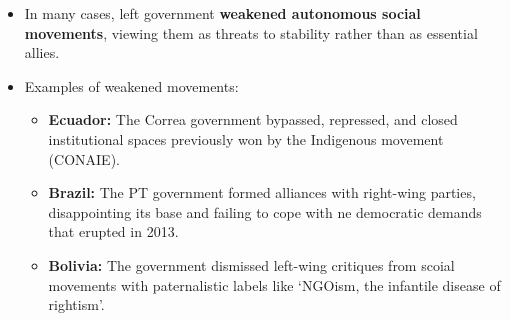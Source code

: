 \documentclass{article}
\begin{document}
\begin{itemize}
\begin{itemize}
            \item In many cases, left government
            \textbf{weakened autonomous social movements}, viewing them as
            threats to stability rather than as essential allies.
            \item Examples of weakened movements:
            \begin{itemize}
                \item \textbf{Ecuador:} The Correa government bypassed,
                repressed, and closed institutional spaces previously won by
                the Indigenous movement (CONAIE).
                \item \textbf{Brazil:} The PT government formed alliances
                with right-wing parties, disappointing its base and failing
                to cope with ne democratic demands that erupted in 2013.
                \item \textbf{Bolivia:} The government dismissed left-wing
                critiques from scoial movements with paternalistic labels
                like `NGOism, the infantile disease of rightism'.
            \end{itemize}
        \end{itemize}
    \end{itemize}
\end{document}
